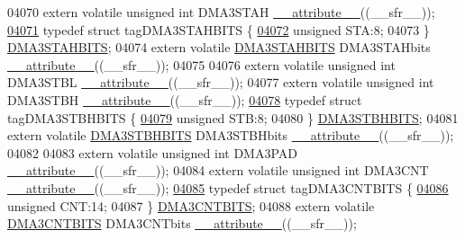 \begin{DoxyCode}
04070 \textcolor{keyword}{extern} \textcolor{keyword}{volatile} \textcolor{keywordtype}{unsigned} \textcolor{keywordtype}{int}  DMA3STAH \hyperlink{a00015_a493c46f03454991ccc5aa7a6e1dfb2a7}{\_\_attribute\_\_}((\_\_sfr\_\_));
\hypertarget{a00015_source_l04071}{}\hyperlink{a00014}{04071} \textcolor{keyword}{typedef} \textcolor{keyword}{struct }tagDMA3STAHBITS \{
\hypertarget{a00015_source_l04072}{}\hyperlink{a00014_a0eec78ddd2c12af678d5fab70fe62d14}{04072}   \textcolor{keywordtype}{unsigned} STA:8;
04073 \} \hyperlink{a00014_dc/d0c/a00430}{DMA3STAHBITS};
04074 \textcolor{keyword}{extern} \textcolor{keyword}{volatile} \hyperlink{a00014_dc/d0c/a00430}{DMA3STAHBITS} DMA3STAHbits \hyperlink{a00015_a493c46f03454991ccc5aa7a6e1dfb2a7}{\_\_attribute\_\_}((\_\_sfr\_\_));
04075 
04076 \textcolor{keyword}{extern} \textcolor{keyword}{volatile} \textcolor{keywordtype}{unsigned} \textcolor{keywordtype}{int}  DMA3STBL \hyperlink{a00015_a493c46f03454991ccc5aa7a6e1dfb2a7}{\_\_attribute\_\_}((\_\_sfr\_\_));
04077 \textcolor{keyword}{extern} \textcolor{keyword}{volatile} \textcolor{keywordtype}{unsigned} \textcolor{keywordtype}{int}  DMA3STBH \hyperlink{a00015_a493c46f03454991ccc5aa7a6e1dfb2a7}{\_\_attribute\_\_}((\_\_sfr\_\_));
\hypertarget{a00015_source_l04078}{}\hyperlink{a00014}{04078} \textcolor{keyword}{typedef} \textcolor{keyword}{struct }tagDMA3STBHBITS \{
\hypertarget{a00015_source_l04079}{}\hyperlink{a00014_a9bd043a4db27e09b5035a563a8758fe7}{04079}   \textcolor{keywordtype}{unsigned} STB:8;
04080 \} \hyperlink{a00014_df/d70/a00431}{DMA3STBHBITS};
04081 \textcolor{keyword}{extern} \textcolor{keyword}{volatile} \hyperlink{a00014_df/d70/a00431}{DMA3STBHBITS} DMA3STBHbits \hyperlink{a00015_a493c46f03454991ccc5aa7a6e1dfb2a7}{\_\_attribute\_\_}((\_\_sfr\_\_));
04082 
04083 \textcolor{keyword}{extern} \textcolor{keyword}{volatile} \textcolor{keywordtype}{unsigned} \textcolor{keywordtype}{int}  DMA3PAD \hyperlink{a00015_a493c46f03454991ccc5aa7a6e1dfb2a7}{\_\_attribute\_\_}((\_\_sfr\_\_));
04084 \textcolor{keyword}{extern} \textcolor{keyword}{volatile} \textcolor{keywordtype}{unsigned} \textcolor{keywordtype}{int}  DMA3CNT \hyperlink{a00015_a493c46f03454991ccc5aa7a6e1dfb2a7}{\_\_attribute\_\_}((\_\_sfr\_\_));
\hypertarget{a00015_source_l04085}{}\hyperlink{a00014}{04085} \textcolor{keyword}{typedef} \textcolor{keyword}{struct }tagDMA3CNTBITS \{
\hypertarget{a00015_source_l04086}{}\hyperlink{a00014_a30be39d82c244f19fd98dd74227487f6}{04086}   \textcolor{keywordtype}{unsigned} CNT:14;
04087 \} \hyperlink{a00014_d1/d05/a00423}{DMA3CNTBITS};
04088 \textcolor{keyword}{extern} \textcolor{keyword}{volatile} \hyperlink{a00014_d1/d05/a00423}{DMA3CNTBITS} DMA3CNTbits \hyperlink{a00015_a493c46f03454991ccc5aa7a6e1dfb2a7}{\_\_attribute\_\_}((\_\_sfr\_\_));

\end{DoxyCode}

